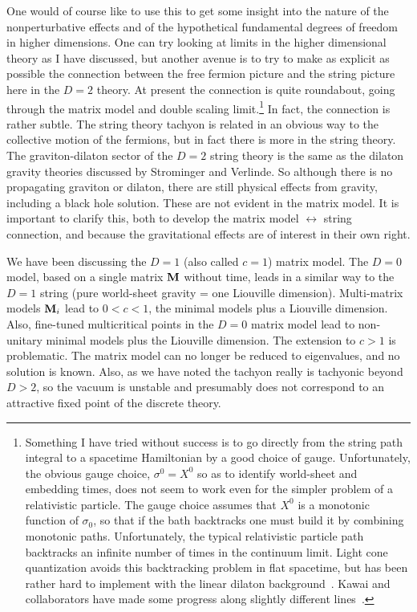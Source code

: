 One would of course like to use this to get some insight into the
nature of the nonperturbative effects and of the hypothetical 
fundamental degrees of freedom in higher dimensions.  One can try
looking at limits in the higher
dimensional theory as I have discussed, but another avenue is to
try to make as explicit as possible the connection between the
free fermion picture and the string picture here in the $D=2$
theory.  At present the connection is quite roundabout, going
through the matrix model and double scaling limit.\footnote
{Something I have tried without success is to go directly from the
string path integral to a spacetime Hamiltonian by a good choice
of gauge.  Unfortunately, the obvious gauge choice, $\sigma^0 =
X^0$ so as to identify world-sheet and embedding times, does not
seem to work even for the simpler problem of a relativistic
particle.  The gauge choice assumes that $X^0$ is a monotonic
function of $\sigma_0$, so that if the bath backtracks one must
build it by combining monotonic paths.  Unfortunately, the
typical relativistic particle path backtracks an infinite number of
times in the continuum limit.  Light cone quantization avoids this
backtracking problem in flat spacetime, but has been rather hard to
implement with the linear dilaton
background~\cite{Smithlc}.  Kawai and collaborators have
made some progress along slightly different
lines~\cite{Ktemp}.}  In fact, the connection is rather
subtle.  The string theory tachyon is related in an obvious way to the
collective motion of the fermions, but in fact there is more in the
string theory.  The graviton-dilaton sector of the $D=2$ string
theory is the same as the dilaton gravity theories discussed by
Strominger and Verlinde.  So although there is no propagating
graviton or dilaton, there are still physical effects from gravity,
including a black hole solution.  These are not evident in the matrix
model.  It is important to clarify this, both to develop the matrix
model
$\leftrightarrow$ string connection, and because
the gravitational effects are of interest in their own right.

We have been discussing
the $D=1$ (also called $c=1$) matrix model. The $D=0$ model, based
on a single matrix ${\bf M}$ without time, leads in a similar way
to the $D=1$ string (pure world-sheet gravity = one Liouville
dimension).  Multi-matrix models
${\bf M}_i$ lead to $0 < c < 1$, the minimal models plus a
Liouville dimension.  Also, fine-tuned multicritical points
in the $D=0$ matrix model lead to
non-unitary minimal models plus the Liouville dimension.  The
extension to $c > 1$ is problematic.  The matrix model can no
longer be reduced to eigenvalues, and no solution is known.  Also,
as we have noted the tachyon really is tachyonic beyond $D > 2$, so
the vacuum is unstable and presumably does not correspond to an
attractive fixed point of the discrete theory. 

